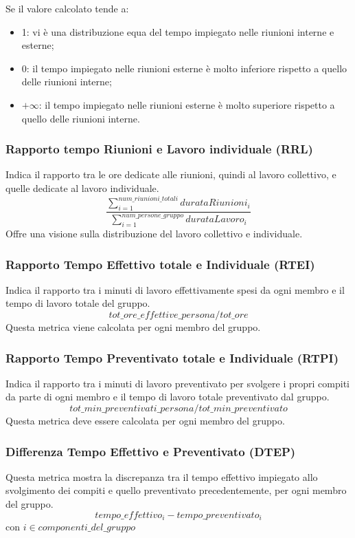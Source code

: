 Se il valore calcolato tende a:
\begin{itemize}
    \item 1: vi è una distribuzione equa del tempo impiegato nelle riunioni interne e esterne;
    \item 0: il tempo impiegato nelle riunioni esterne è molto inferiore rispetto a quello delle riunioni interne;
    \item $+\infty$: il tempo impiegato nelle riunioni esterne è molto superiore rispetto a quello delle riunioni interne.
\end{itemize}
\subsubsection{Rapporto tempo Riunioni e Lavoro individuale (RRL)}
Indica il rapporto tra le ore dedicate alle riunioni, quindi al lavoro collettivo, e quelle dedicate al lavoro individuale.
\[\dfrac{\sum_{i=1}^{num\_riunioni\_totali} durataRiunioni_i}{\sum_{i=1}^{num\_persone\_gruppo} durataLavoro_i}\]
Offre una visione sulla distribuzione del lavoro collettivo e individuale.
\subsubsection{Rapporto Tempo Effettivo totale e Individuale (RTEI)}
Indica il rapporto tra i minuti di lavoro effettivamente spesi da ogni membro e il tempo di lavoro totale del gruppo.
\[tot\_ore\_effettive\_persona / tot\_ore
\]
Questa metrica viene calcolata per ogni membro del gruppo.
\subsubsection{Rapporto Tempo Preventivato totale e Individuale (RTPI)}
Indica il rapporto tra i minuti di lavoro preventivato per svolgere i propri compiti da parte di ogni membro e il tempo di lavoro totale preventivato dal gruppo.
\[tot\_min\_preventivati\_persona / tot\_min\_preventivato\]
Questa metrica deve essere calcolata per ogni membro del gruppo.
\subsubsection{Differenza Tempo Effettivo e Preventivato (DTEP)}
Questa metrica mostra la discrepanza tra il tempo effettivo impiegato allo svolgimento dei compiti e quello preventivato precedentemente, per ogni membro del gruppo.
\[tempo\_effettivo_i - tempo\_preventivato_i\]
con $i \in {componenti\_del\_gruppo}$
